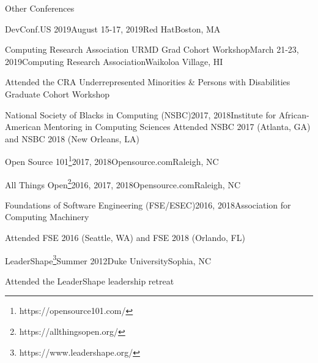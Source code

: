 \documentclass{resume} %
\begin{document}
\begin{rSection}{Other Conferences}

\begin{rSubsection}{DevConf.US 2019}{August 15-17, 2019}{Red Hat}{Boston, MA}
\end{rSubsection}
\begin{rSubsection}{Computing Research Association URMD Grad Cohort Workshop}{March 21-23, 2019}{Computing Research Association}{Waikoloa Village, HI}
\item Attended the CRA Underrepresented Minorities \& Persons with Disabilities Graduate Cohort Workshop
\end{rSubsection}
\begin{rSubsection}{National Society of Blacks in Computing (NSBC)}{2017, 2018}{Institute for African-American Mentoring in Computing Sciences}{}
Attended NSBC 2017 (Atlanta, GA) and NSBC 2018 (New Orleans, LA)
\end{rSubsection}
\begin{rSubsection}{Open Source 101\footnote{https://opensource101.com/}}{2017, 2018}{Opensource.com}{Raleigh, NC}
\end{rSubsection}
\begin{rSubsection}{All Things Open\footnote{https://allthingsopen.org/}}{2016, 2017, 2018}{Opensource.com}{Raleigh, NC}
\end{rSubsection}
\begin{rSubsection}{Foundations of Software Engineering (FSE/ESEC)}{2016, 2018}{Association for Computing Machinery}{}
\item Attended FSE 2016 (Seattle, WA) and FSE 2018 (Orlando, FL)
\end{rSubsection}
\begin{rSubsection}
{LeaderShape\footnote{https://www.leadershape.org/}}{Summer 2012}{Duke University}{Sophia, NC}
\item Attended the LeaderShape leadership retreat
\end{rSubsection}

\end{rSection}
\end{document}
